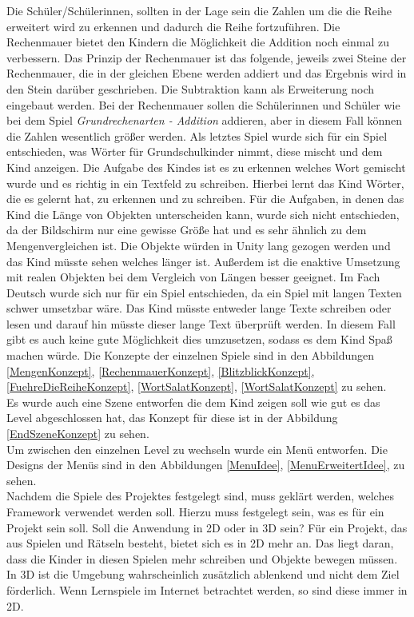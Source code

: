 Die Schüler/Schülerinnen, sollten in der Lage sein die Zahlen um die die Reihe erweitert wird zu erkennen und dadurch die Reihe fortzuführen. Die Rechenmauer bietet den Kindern die Möglichkeit die Addition noch einmal zu verbessern. Das Prinzip der Rechenmauer ist das folgende, jeweils zwei Steine der Rechenmauer, die in der gleichen Ebene werden addiert und das Ergebnis wird in den Stein darüber geschrieben. Die Subtraktion kann als Erweiterung noch eingebaut werden. Bei der Rechenmauer sollen die Schülerinnen und Schüler wie bei dem Spiel \textit{Grundrechenarten - Addition} addieren, aber in diesem Fall können die Zahlen wesentlich größer werden. Als letztes Spiel wurde sich für ein Spiel entschieden, was Wörter für Grundschulkinder nimmt, diese mischt und dem Kind anzeigen. Die Aufgabe des Kindes ist es zu erkennen welches Wort gemischt wurde und es richtig in ein Textfeld zu schreiben. Hierbei lernt das Kind Wörter, die es gelernt hat, zu erkennen und zu schreiben. Für die Aufgaben, in denen das Kind die Länge von Objekten unterscheiden kann, wurde sich nicht entschieden, da der Bildschirm nur eine gewisse Größe hat und es sehr ähnlich zu dem Mengenvergleichen ist. Die Objekte würden in Unity lang gezogen werden und das Kind müsste sehen welches länger ist. Außerdem ist die enaktive Umsetzung mit realen Objekten bei dem Vergleich von Längen besser geeignet. Im Fach Deutsch wurde sich nur für ein Spiel entschieden, da ein Spiel mit langen Texten schwer umsetzbar wäre. Das Kind müsste entweder lange Texte schreiben oder lesen und darauf hin müsste dieser lange Text überprüft werden. In diesem Fall gibt es auch keine gute Möglichkeit dies umzusetzen, sodass es dem Kind Spaß machen würde. Die Konzepte der einzelnen Spiele sind in den Abbildungen \ref{MengenKonzept}, \ref{RechenmauerKonzept}, \ref{BlitzblickKonzept}, \ref{FuehreDieReiheKonzept}, \ref{WortSalatKonzept}, \ref{WortSalatKonzept} zu sehen.\\
Es wurde auch eine Szene entworfen die dem Kind zeigen soll wie gut es das Level abgeschlossen hat, das Konzept für diese ist in der Abbildung \ref{EndSzeneKonzept} zu sehen.\\       
Um zwischen den einzelnen Level zu wechseln wurde ein Menü entworfen.
Die Designs der Menüs sind in den Abbildungen \ref{MenuIdee}, \ref{MenuErweitertIdee}, zu sehen.\\
Nachdem die Spiele des Projektes festgelegt sind, muss geklärt werden, welches Framework verwendet werden soll. Hierzu muss festgelegt sein, was es für ein Projekt sein soll. Soll die Anwendung in 2D oder in 3D sein? Für ein Projekt, das aus Spielen und Rätseln besteht, bietet sich es in 2D mehr an. Das liegt daran, dass die Kinder in diesen Spielen mehr schreiben und Objekte bewegen müssen. In 3D ist die Umgebung wahrscheinlich zusätzlich ablenkend und nicht dem Ziel förderlich. Wenn Lernspiele im Internet betrachtet werden, so sind diese immer in 2D.\\
